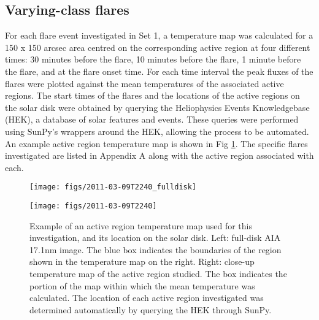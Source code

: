 \documentclass{article}
\begin{document}
\subsection{Varying-class flares}
For each flare event investigated in Set 1, a temperature map was calculated for a 150 x 150 arcsec area centred on the corresponding active region at four different times: 30 minutes before the flare, 10 minutes before the flare, 1 minute before the flare, and at the flare onset time.
For each time interval the peak fluxes of the flares were plotted against the mean temperatures of the associated active regions.
The start times of the flares and the locations of the active regions on the solar disk were obtained by querying the Heliophysics Events Knowledgebase (HEK), a database of solar features and events.
These queries were performed using SunPy's wrappers around the HEK, allowing the process to be automated.
An example active region temperature map is shown in Fig \ref{fig:ar-demo}.
The specific flares investigated are listed in Appendix A along with the active region associated with each. %

\begin{figure}
\begin{centering}
\texttt{[image: figs/2011-03-09T2240\_fulldisk]}
\par\end{centering}

\begin{centering}
\texttt{[image: figs/2011-03-09T2240]}
\par\end{centering}

\caption{Example of an active region temperature map used for this investigation, and its location on the solar disk.
Left: full-disk AIA 17.1nm image.
The blue box indicates the boundaries of the region shown in the temperature map on the right.
Right: close-up temperature map of the active region studied.
The box indicates the portion of the map within which the mean temperature was calculated.
The location of each active region investigated was determined automatically by querying the HEK through SunPy.\label{fig:ar-demo}}
\end{figure}
\end{document}
